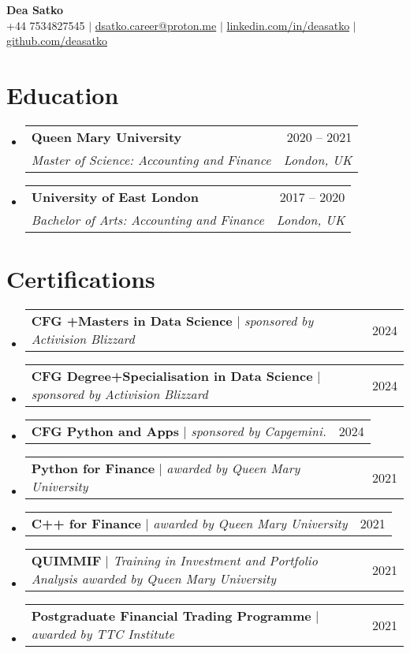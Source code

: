 \documentclass[letterpaper,11pt]{article}
\makeatletter
\newcommand{\resumeSubheading}[4]{
  \vspace{-2pt}\item
    \begin{tabular*}{0.97\textwidth}[t]{l@{\extracolsep{\fill}}r}
      \textbf{#1} & #2 \\
      \textit{\small#3} & \textit{\small #4} \\
    \end{tabular*}\vspace{-7pt}
}
\newcommand{\resumeProjectHeading}[2]{
    \item
    \begin{tabular*}{0.97\textwidth}{l@{\extracolsep{\fill}}r}
      \small#1 & #2 \\
    \end{tabular*}\vspace{-7pt}
}
\newcommand{\resumeSubHeadingListStart}{\begin{itemize}[leftmargin=0.15in, label={}]}
\newcommand{\resumeSubHeadingListEnd}{\end{itemize}}
\makeatother
\begin{document}
\begin{center}
    \textbf{\Huge Dea Satko} \\ \vspace{1pt}
    \small +44 7534827545 $|$ \href{mailto:dsatko.career@proton.me}{{dsatko.career@proton.me}} $|$ 
    \href{https://www.linkedin.com/in/deasatko/}{{linkedin.com/in/deasatko}} $|$
    \href{https://github.com/deasatko/}{{github.com/deasatko}}
\end{center}


\section{Education}
  \resumeSubHeadingListStart
    \resumeSubheading
      {Queen Mary University}{2020 -- 2021}
      {Master of Science: Accounting and Finance}{London, UK}
    \resumeSubheading
      {University of East London}{2017 -- 2020}
      {Bachelor of Arts: Accounting and Finance}{London, UK}
  \resumeSubHeadingListEnd

\section{Certifications}
  \resumeSubHeadingListStart
    \resumeProjectHeading
      {\textbf{CFG +Masters in Data Science} $|$ \emph{sponsored by Activision Blizzard}}{2024}
    \resumeProjectHeading
      {\textbf{CFG Degree+Specialisation in Data Science} $|$ \emph{sponsored by Activision Blizzard}}{2024}
    \resumeProjectHeading
      {\textbf{CFG Python and Apps} $|$ \emph{sponsored by Capgemini.}}{2024}
    \resumeProjectHeading
      {\textbf{Python for Finance} $|$ \emph{awarded by Queen Mary University}}{2021}
      \resumeProjectHeading
      {\textbf{C++ for Finance} $|$ \emph{awarded by Queen Mary University}}{2021}
    \resumeProjectHeading
      {\textbf{QUIMMIF} $|$ \emph{Training in Investment and Portfolio Analysis awarded by Queen Mary University}}{2021}
    \resumeProjectHeading
      {\textbf{Postgraduate Financial Trading Programme} $|$ \emph{awarded by TTC Institute}}{2021}
\resumeSubHeadingListEnd

\end{document}
